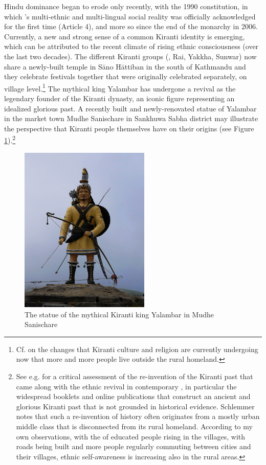 Hindu dominance began to erode only recently, with the 1990 constitution, in which 's multi-ethnic and multi-lingual social reality was officially acknowledged for the first time (Article 4), and more so since the end of the monarchy in 2006. Currently, a new and strong sense of a common Kiranti identity is emerging, which can be attributed to the recent climate of rising ethnic consciousness (over the last two decades). The different Kiranti groups (, Rai, Yakkha, Sunwar) now share a newly-built temple in Sāno Hāttiban in the south of Kathmandu and they celebrate festivals together that were originally celebrated separately, on
village level.\footnote{Cf. \citet{Gaenszle_Redefining} on the changes that Kiranti culture and religion are currently undergoing now that more and more people live outside the rural homeland.}  The mythical king Yalambar has undergone a revival as the legendary founder of the Kiranti dynasty, an iconic figure representing an idealized glorious past. A recently built and newly-renovated statue of Yalambar in the market town Mudhe Sanischare in Sankhuwa Sabha district may illustrate the perspective that Kiranti people themselves have on their origins (see Figure \ref{yalambar}).\footnote{See e.g. \citet{Schlemmer2003_New} for a critical assessment of the re-invention of the Kiranti past that came along with the ethnic revival in contemporary , in particular the widespread booklets and online publications that construct an ancient and glorious Kiranti past that is not grounded in historical evidence. Schlemmer notes that such a re-invention of history often originates from a mostly urban middle class that is disconnected from its rural homeland. According to my own observations, with the  of educated people rising in the villages, with roads being built and more people regularly commuting between cities and their villages, ethnic self-awareness is increasing also in the rural areas.}

\begin{figure}
\centering
\includegraphics[height=8cm]{figures/yalambar.jpg}
\caption{The statue of the mythical Kiranti king Yalambar in Mudhe Sanischare}\label{yalambar}
\end{figure}


